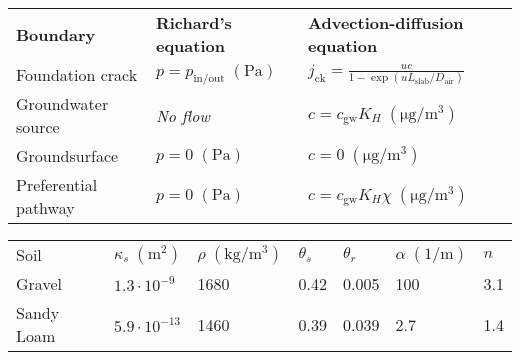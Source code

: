\documentclass[journal=esthag,manuscript=article]{achemso}
\begin{document}
\begin{table}[htb!]
 \begin{tabular}{l l l}
  \toprule
  \textbf{Boundary}            & \textbf{Richard's equation}              & \textbf{Advection-diffusion equation}                                      \\
  Foundation crack          & $p = p_\mathrm{in/out} \; \mathrm{(Pa)}$ & $j_\mathrm{ck} = \frac{u c}{1 - \exp{(u L_\mathrm{slab}/D_\mathrm{air})}}$ \\
  Groundwater source        & \textit{No flow}                                      & $c = c_\mathrm{gw} K_H \; \mathrm{(\mu g/m^3)}$                            \\
  Groundsurface            & $p = 0 \; \mathrm{(Pa)}$                 & $c = 0 \; \mathrm{(\mu g/m^3)}$                                            \\
  Preferential pathway & $p = 0 \; \mathrm{(Pa)}$                 & $c = c_\mathrm{gw} K_H \chi \; \mathrm{(\mu g/m^3)}$                       \\
  \bottomrule
 \end{tabular}
 \bigskip
 \begin{tabular}{l l l l l l l}
  \toprule
  Soil       & $\kappa_s \; \mathrm{(m^2)}$ & $\rho \; \mathrm{(kg/m^3)}$ & $\theta_s$ & $\theta_r$ & $\alpha \; \mathrm{(1/m)}$ & $n$ \\
  Gravel     & $1.3 \cdot 10^{-9}$                     & 1680                                    & 0.42       & 0.005      & 100                        & 3.1 \\
  Sandy Loam & $5.9 \cdot 10^{-13}$                    & 1460                                    & 0.39       & 0.039      & 2.7                        & 1.4 \\
  \bottomrule
 \end{tabular}
 \bigskip

\end{table}
\end{document}
